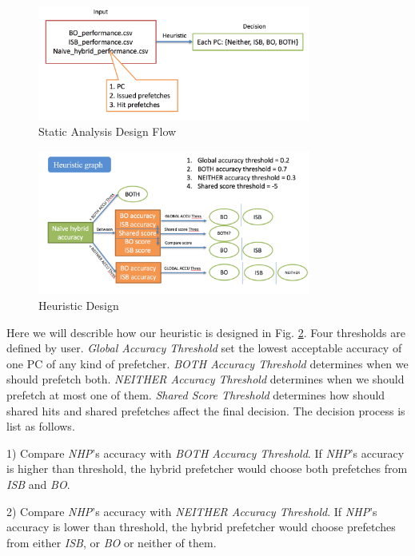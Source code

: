   \begin{figure}[ht!]
	  \centering
	  \includegraphics[width=0.8\textwidth]{images/staticanalysis_flow.png}
	  \caption{Static Analysis Design Flow}
	  \label{fig:staticanalysis_flow}
  \end{figure}


  \begin{figure}[ht!]
	  \centering
	  \includegraphics[width=0.8\textwidth]{images/heuristic_design.png}
	  \caption{Heuristic Design}
	  \label{fig:heuritic design} 
  \end{figure}

  Here we will describle how our heuristic is designed in Fig. \ref{fig:heuritic design}. Four thresholds are defined by user. \emph{Global Accuracy Threshold} set the lowest acceptable accuracy of one PC of any kind of prefetcher. \emph{BOTH Accuracy Threshold} determines when we should prefetch both. \emph{NEITHER Accuracy Threshold} determines when we should prefetch at most one of them. \emph{Shared Score Threshold} determines how should shared hits and shared prefetches affect the final decision. The decision process is list as follows.

  1) Compare \emph{NHP}'s accuracy with \emph{BOTH Accuracy Threshold}. If \emph{NHP}'s accuracy is higher than threshold, the hybrid prefetcher would choose both prefetches from \emph{ISB} and \emph{BO}.

  2) Compare \emph{NHP}'s accuracy with \emph{NEITHER Accuracy Threshold}. If \emph{NHP}'s accuracy is lower than threshold, the hybrid prefetcher would choose prefetches from either \emph{ISB}, or \emph{BO} or neither of them.

